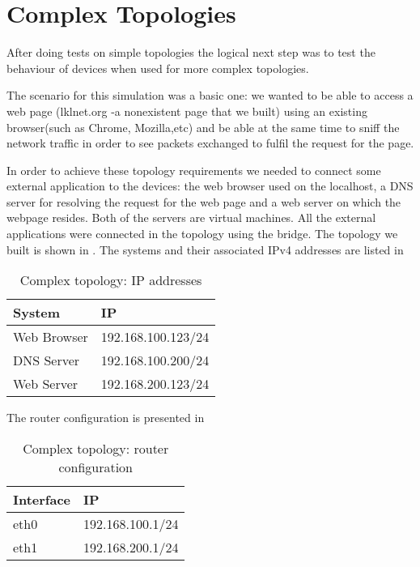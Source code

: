 \section{Complex Topologies}
\label{sec:complex-top}
After doing tests on simple topologies the logical next step was to test the behaviour of \project devices when used for more complex topologies. 

The scenario for this simulation was a basic one: we wanted to be able to access a web page 
(lklnet.org -a nonexistent page that we built) using an existing browser(such as Chrome, Mozilla,etc) 
and be able at the same time to sniff the network traffic in order to see packets exchanged to fulfil the request for the page.

In order to achieve these topology requirements we needed to connect some external application to 
the \project devices: the web browser used on the localhost, a DNS server for resolving the request for 
the web page and a web server on which the webpage resides. Both of the servers are virtual machines.
All the external applications were connected in the topology using the bridge.  
The topology we built is shown in .
The systems and their associated IPv4 addresses are listed in 
\begin{center}
  \begin{table}[htb]
  \begin{center}
  \begin{tabular}{| l | l |}
	\hline
	System & IP \\ \hline
	Web Browser & 192.168.100.123/24 \\ \hline
	DNS Server & 192.168.100.200/24 \\ \hline
	Web Server & 192.168.200.123/24 \\	 
    \hline
  \end{tabular}
  \end{center}
  \caption{Complex topology: IP addresses}
  \label{table:complex-ip}
  \end{table}
\end{center}
The router configuration is presented in 
\begin{center}
  \begin{table}[htb]
  \begin{center}
  \begin{tabular}{| l | l |}
	\hline
	Interface & IP \\ \hline
	eth0 & 192.168.100.1/24 \\ \hline
	eth1 & 192.168.200.1/24 \\	 
    \hline
  \end{tabular}
  \end{center}
  \caption{Complex topology: router configuration}
  \label{table:complex-router}
  \end{table}
\end{center}
